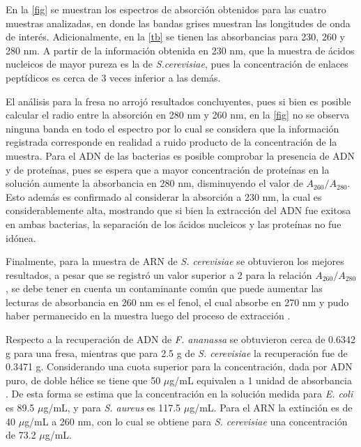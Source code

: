\documentclass[fleqn,10pt]{SelfArx}
\begin{document}
	En la \autoref{fig} se muestran los espectros de absorción obtenidos para las cuatro muestras analizadas, en donde las bandas grises muestran las longitudes de onda de interés. Adicionalmente, en la \autoref{tb} se tienen las absorbancias para 230, 260 y 280 nm. A partir de la información obtenida en 230 nm, que la muestra de ácidos nucleicos de mayor pureza es la de \textit{S.cerevisiae}, pues la concentración de enlaces peptídicos es cerca de 3 veces inferior a las demás.

	El análisis para la fresa no arrojó resultados concluyentes, pues si bien es posible calcular el radio entre la absorción en 280 nm y 260 nm, en la \autoref{fig} no se observa ninguna banda en todo el espectro por lo cual se considera que la información registrada corresponde en realidad a ruido producto de la concentración de la muestra. Para el ADN de las bacterias es posible comprobar la presencia de ADN y de proteínas, pues se espera que a mayor concentración de proteínas en la solución aumente la absorbancia en 280 nm, disminuyendo el valor de $A_{260} / A_{280}$. Esto además es confirmado al considerar la absorción a 230 nm, la cual es considerablemente alta, mostrando que si bien la extracción del ADN fue exitosa en ambas bacterias, la separación de los ácidos nucleicos y las proteínas no fue idónea.
	
	Finalmente, para la muestra de ARN de \textit{S. cerevisiae} se obtuvieron los mejores resultados, a pesar que se registró un valor superior a 2 para la relación $A_{260} / A_{280}$, se debe tener en cuenta un contaminante com\'un que puede aumentar las lecturas de absorbancia en 260 nm es el fenol, el cual absorbe en 270 nm y pudo haber permanecido en la muestra luego del proceso de extracci\'on \cite{toni2018optimization}.
	
	Respecto a la recuperación de ADN de \textit{F. ananassa} se obtuvieron cerca de 0.6342 g para una fresa, mientras que para 2.5 g de \textit{S. cerevisiae} la recuperación fue de 0.3471 g. Considerando una cuota superior para la concentración, dada por ADN puro, de doble hélice se tiene que 50 $\mu$g/mL equivalen a 1 unidad de absorbancia \cite{sambrook2001molecular}. De esta forma se estima que la concentración en la solución medida para \textit{E. coli} es 89.5 $\mu$g/mL, y para \textit{S. aureus} es 117.5 $\mu$g/mL. Para el ARN la extinción es de 40 $\mu$g/mL a 260 nm, con lo cual se obtiene para \textit{S. cerevisiae} una concentración de 73.2 $\mu$g/mL.
	
\end{document}
